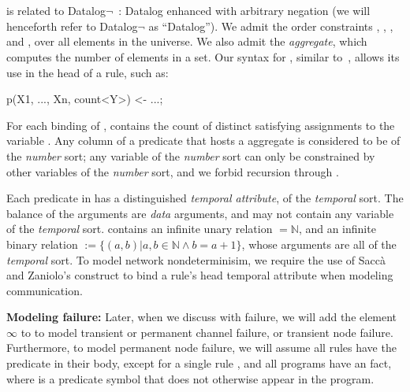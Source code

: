 \section{\large \bf \lang}
\label{sec:slang}

\lang is related to Datalog$\lnot$~\cite{ullmanbook}: Datalog enhanced with arbitrary negation (we will henceforth refer to Datalog$\lnot$ as ``Datalog'').  We admit the order constraints \dedalus{<}, \dedalus{=}, \dedalus{!=}, and \dedalus{<=}, over all elements in the universe.  We also admit the  {\em aggregate}, which computes the number of elements in a set.  Our syntax for , similar to~\cite{datalog-agg}, allows its use in the head of a rule, such as: 

\begin{Dedalus}
p(X1, ..., Xn, count<Y>) <- ...;
\end{Dedalus}

For each binding of ,  contains the count of distinct satisfying assignments to the variable .  Any column of a predicate that hosts a  aggregate is considered to be of the {\em number} sort; any variable of the {\em number} sort can only be constrained by other variables of the {\em number} sort, and we forbid recursion through .

Each predicate in \lang has a distinguished {\em temporal attribute}, of the {\em temporal} sort.  The balance of the arguments are {\em data} arguments, and may not contain any variable of the {\em temporal} sort.  \lang contains an infinite unary relation  $= \mathbb{N}$, and an infinite binary relation  $:= \{(a,b) | a,b \in \mathbb{N} \land b = a + 1\}$, whose arguments are all of the {\em temporal} sort.  To model network nondeterminisim, we require the use of Sacc\`{a} and Zaniolo's  construct to bind a rule's head temporal attribute when modeling communication.

{\bf Modeling failure:}  Later, when we discuss \lang with failure, we will add the element $\infty$ to  to model transient or permanent channel failure, or transient node failure.  Furthermore, to model permanent node failure, we will assume all rules have the  predicate in their body, except for a single rule , and all programs have an  fact, where  is a predicate symbol that does not otherwise appear in the program.    

